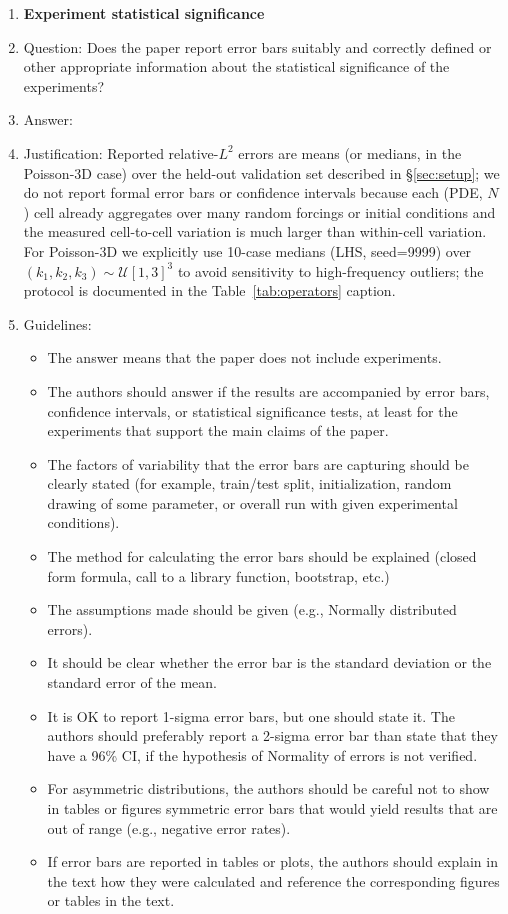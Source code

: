\begin{enumerate}
\item {\bf Experiment statistical significance}
    \item[] Question: Does the paper report error bars suitably and correctly defined or other appropriate information about the statistical significance of the experiments?
    \item[] Answer: \answerNo{}
    \item[] Justification: Reported relative-$L^2$ errors are means (or medians, in the Poisson-3D case) over the held-out validation set described in \S\ref{sec:setup}; we do not report formal error bars or confidence intervals because each (PDE, $N$) cell already aggregates over many random forcings or initial conditions and the measured cell-to-cell variation is much larger than within-cell variation. For Poisson-3D we explicitly use 10-case medians (LHS, seed=9999) over $(k_1,k_2,k_3) \sim \mathcal{U}[1,3]^3$ to avoid sensitivity to high-frequency outliers; the protocol is documented in the Table~\ref{tab:operators} caption.
    \item[] Guidelines:
    \begin{itemize}
        \item The answer \answerNA{} means that the paper does not include experiments.
        \item The authors should answer \answerYes{} if the results are accompanied by error bars, confidence intervals, or statistical significance tests, at least for the experiments that support the main claims of the paper.
        \item The factors of variability that the error bars are capturing should be clearly stated (for example, train/test split, initialization, random drawing of some parameter, or overall run with given experimental conditions).
        \item The method for calculating the error bars should be explained (closed form formula, call to a library function, bootstrap, etc.)
        \item The assumptions made should be given (e.g., Normally distributed errors).
        \item It should be clear whether the error bar is the standard deviation or the standard error of the mean.
        \item It is OK to report 1-sigma error bars, but one should state it. The authors should preferably report a 2-sigma error bar than state that they have a 96\% CI, if the hypothesis of Normality of errors is not verified.
        \item For asymmetric distributions, the authors should be careful not to show in tables or figures symmetric error bars that would yield results that are out of range (e.g., negative error rates).
        \item If error bars are reported in tables or plots, the authors should explain in the text how they were calculated and reference the corresponding figures or tables in the text.
    \end{itemize}


\end{enumerate}
